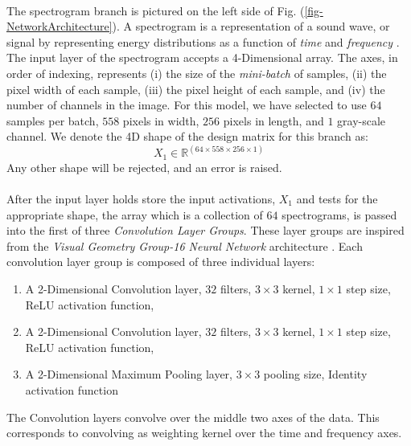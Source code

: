 \documentclass[12pt,letterpaper]{article}
\begin{document}
\paragraph*{}The spectrogram branch is pictured on the left side of Fig. (\ref{fig-NetworkArchitecture}). A spectrogram is a representation of a sound wave, or signal by representing energy distributions as a function of \textit{time} and \textit{frequency} \cite{White,Olson,Khan}. The input layer of the spectrogram accepts a 4-Dimensional array. The axes, in order of indexing, represents (i) the size of the \textit{mini-batch} of samples, (ii) the pixel width of each sample, (iii) the pixel height of each sample, and (iv) the number of channels in the image. For this model, we have selected to use $64$ samples per batch, $558$ pixels in width, $256$ pixels in length, and $1$ gray-scale channel. We denote the 4D shape of the design matrix for this branch as:
\begin{equation}
\label{eqn-shapeX1}
X_1 \in \mathbb{R}^{(64 \times 558 \times 256 \times 1)}
\end{equation}
Any other shape will be rejected, and an error is raised.

\paragraph*{}After the input layer holds store the input activations, $X_1$ and tests for the appropriate shape, the array which is a collection of $64$ spectrograms, is passed into the first of three \textit{Convolution Layer Groups}. These layer groups are inspired from the \textit{Visual Geometry Group-16 Neural Network} architecture \cite{Goodfellow,Loy}. Each convolution layer group is composed of three individual layers: 
\begin{enumerate}
\item A 2-Dimensional Convolution layer, $32$ filters, $3 \times 3$ kernel, $1 \times 1$ step size, ReLU activation function,
\item A 2-Dimensional Convolution layer, $32$ filters, $3 \times 3$ kernel, $1 \times 1$ step size, ReLU activation function,
\item A 2-Dimensional Maximum Pooling layer, $3 \times 3$ pooling size, Identity activation function
\end{enumerate}  
The Convolution layers convolve over the middle two axes of the data. This corresponds to convolving as weighting kernel over the time and frequency axes.
\end{document}

